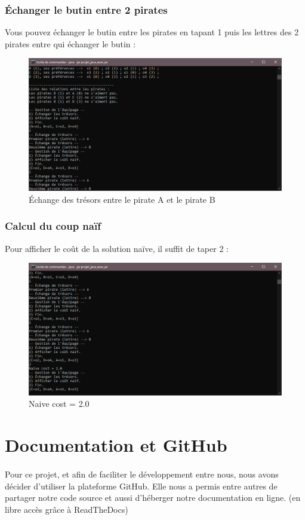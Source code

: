 \documentclass[12pt]{article}
\begin{document}
\subsubsection{Échanger le butin entre 2 pirates}
Vous pouvez échanger le butin entre les pirates en tapant 1 puis les lettres des 2 pirates entre qui échanger le butin :
\begin{figure}[H]
\includegraphics[width=16cm]{swap}
\centering
\caption{Échange des trésors entre le pirate A et le pirate B}
\end{figure}
\subsubsection{Calcul du coup naïf}
Pour afficher le coût de la solution naïve, il suffit de taper 2 :
\begin{figure}[H]
\includegraphics[width=16cm]{naive_cost}
\centering
\caption{Naive cost = 2.0}
\end{figure}
\section{Documentation et GitHub}
\paragraph{} Pour ce projet, et afin de faciliter le développement entre nous, nous avons décider d'utiliser la plateforme GitHub.
Elle nous a permis entre autres de partager notre code source et aussi d'héberger notre documentation en ligne. (en libre accès grâce à ReadTheDocs)
\end{document}
